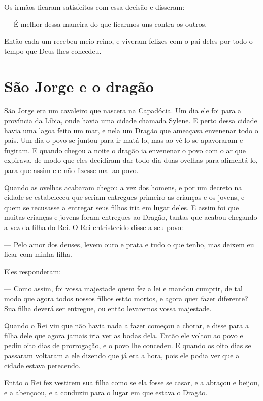 Os irmãos ficaram satisfeitos com essa decisão e disseram:

— É melhor dessa maneira do que ficarmos uns contra os outros. 

Então cada um recebeu meio reino, e viveram felizes com o pai deles
por todo o tempo que Deus lhes concedeu.

\chapter{São Jorge e o dragão}

São Jorge era um cavaleiro que nascera na Capadócia. Um dia ele foi
para a província da Líbia, onde havia uma cidade chamada Sylene. E
perto dessa cidade havia uma lagoa feito um mar, e nela um Dragão que
ameaçava envenenar todo o país. Um dia o povo se juntou para ir
matá-lo, mas ao vê-lo se apavoraram e fugiram. E quando chegou a
noite o dragão ia envenenar o povo com o ar que expirava, de modo que
eles decidiram dar todo dia duas ovelhas para alimentá-lo, para que
assim ele não fizesse mal ao povo. 

Quando as ovelhas acabaram chegou a vez dos homens, e por um decreto
na cidade se estabeleceu que seriam entregues primeiro as crianças e
os jovens, e quem se recusasse a entregar seus filhos iria em lugar
deles. E assim foi que muitas crianças e jovens foram entregues ao
Dragão, tantas que acabou chegando a vez da filha do Rei. O Rei
entristecido disse a seu povo:

— Pelo amor dos deuses, levem ouro e prata e tudo o que tenho, mas
deixem eu ficar com minha filha. 

Eles responderam:

— Como assim, foi vossa majestade quem fez a lei e mandou cumprir, de
tal modo que agora todos nossos filhos estão mortos, e agora quer
fazer diferente? Sua filha deverá ser entregue, ou então levaremos
vossa majestade. 

Quando o Rei viu que não havia nada a fazer começou a chorar, e disse
para a filha dele que agora jamais iria ver as bodas dela. Então ele
voltou ao povo e pediu oito dias de prorrogação, e o povo lhe
concedeu. E quando os oito dias se passaram voltaram a ele dizendo
que já era a hora, pois ele podia ver que a cidade estava perecendo.

Então o Rei fez vestirem sua filha como se ela fosse se casar, e a
abraçou e beijou, e a abençoou, e a conduziu para o lugar em que
estava o Dragão. 

